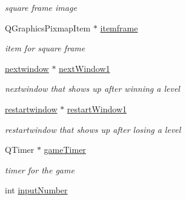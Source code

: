 \begin{DoxyCompactItemize}
\begin{DoxyCompactList}\small\item\em square frame image \end{DoxyCompactList}\item 
\hypertarget{classgamemanager3_a6f4d5eeea40240e3a823100db3d1b474}{\-Q\-Graphics\-Pixmap\-Item $\ast$ \hyperlink{classgamemanager3_a6f4d5eeea40240e3a823100db3d1b474}{itemframe}}\label{classgamemanager3_a6f4d5eeea40240e3a823100db3d1b474}

\begin{DoxyCompactList}\small\item\em item for square frame \end{DoxyCompactList}\item 
\hypertarget{classgamemanager3_aab1f148cc777a03b52d1f5da4af38fca}{\hyperlink{classnextwindow}{nextwindow} $\ast$ \hyperlink{classgamemanager3_aab1f148cc777a03b52d1f5da4af38fca}{next\-Window1}}\label{classgamemanager3_aab1f148cc777a03b52d1f5da4af38fca}

\begin{DoxyCompactList}\small\item\em nextwindow that shows up after winning a level \end{DoxyCompactList}\item 
\hypertarget{classgamemanager3_aab13b9956bc2888cc5612e6b47762bcd}{\hyperlink{classrestartwindow}{restartwindow} $\ast$ \hyperlink{classgamemanager3_aab13b9956bc2888cc5612e6b47762bcd}{restart\-Window1}}\label{classgamemanager3_aab13b9956bc2888cc5612e6b47762bcd}

\begin{DoxyCompactList}\small\item\em restartwindow that shows up after losing a level \end{DoxyCompactList}\item 
\hypertarget{classgamemanager3_ac6ae7dcbc695886ea43f1de39946727c}{\-Q\-Timer $\ast$ \hyperlink{classgamemanager3_ac6ae7dcbc695886ea43f1de39946727c}{game\-Timer}}\label{classgamemanager3_ac6ae7dcbc695886ea43f1de39946727c}

\begin{DoxyCompactList}\small\item\em timer for the game \end{DoxyCompactList}\item 
\hypertarget{classgamemanager3_a8310ec4b2e69f3d86f5bb30b324138a6}{int \hyperlink{classgamemanager3_a8310ec4b2e69f3d86f5bb30b324138a6}{input\-Number}}\label{classgamemanager3_a8310ec4b2e69f3d86f5bb30b324138a6}


\end{DoxyCompactItemize}
